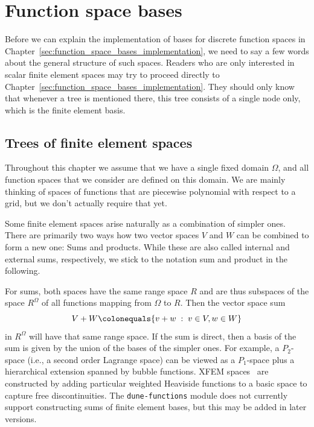 \documentclass[a4paper,10pt,headings=normal,bibliography=totoc]{scrartcl}
\newcommand{\dunemodule}[1]{\texttt{#1}}
\begin{document}
\label{sec:notation}

\section{Function space bases}
\label{sec:finite_element_trees}


Before we can explain the implementation of bases for discrete function spaces in Chapter~\ref{sec:function_space_bases_implementation},
we need to say a few words about the general structure of such spaces.
Readers who are only interested in scalar finite element spaces may try to proceed directly to
Chapter~\ref{sec:function_space_bases_implementation}.  They should only know that whenever a tree
is mentioned there, this tree consists of a single node only, which is the finite element basis.

\subsection{Trees of finite element spaces}

Throughout this chapter we assume that we have a single fixed domain $\Omega$, and all function spaces
that we consider are defined on this domain.  We are mainly thinking of spaces of functions that are
piecewise polynomial with respect to a grid, but we don't actually require that yet.

Some finite element spaces arise naturally as a combination of simpler ones.
There are primarily two ways how two vector spaces $V$ and $W$ can be combined
to form a new one: Sums and products. While these are also called
internal and external sums, respectively, we stick to the notation
sum and product in the following.

For sums, both spaces
have the same range space $R$ and are thus subspaces of the space $R^\Omega$
of all functions mapping from $\Omega$ to $R$. Then the vector space sum
\begin{equation*}
  V + W
  \colonequals
  \{ v + w \; : \; v \in V, w \in W \}
\end{equation*}
in $R^\Omega$ will have that same range space.
If the sum is direct, then a basis of the sum is given by the union of the bases of
the simpler ones. For example, a $P_2$-space (i.e., a second order Lagrange space)
can be viewed as a $P_1$-space plus a hierarchical extension spanned by bubble functions.
XFEM spaces~\cite{moes_dolbow_belytschko:1999} are constructed by adding particular weighted Heaviside
functions to a basic space to capture free discontinuities.
The \dunemodule{dune-functions} module does not currently support constructing sums
of finite element bases, but this may be added in later versions.
\end{document}
